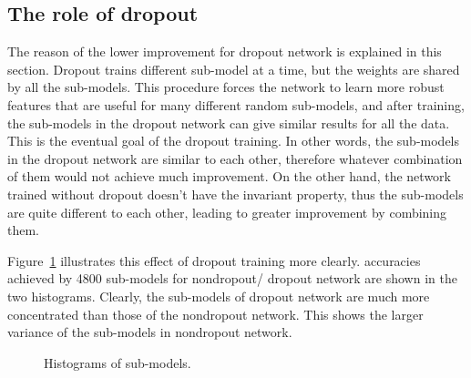 \documentclass{article} %
\begin{document}
\subsection{The role of dropout}
The reason of the lower improvement for dropout network is explained in this section. Dropout trains different sub-model at a time, but the weights are shared by all the sub-models. This procedure forces the network to learn more robust features that are useful for many different random sub-models, and after training, the sub-models in the dropout network can give similar results for all the data. This is the eventual goal of the dropout training. In other words, the sub-models in the dropout network are similar to each other, therefore whatever combination of them would not achieve much improvement. On the other hand, the network trained without dropout doesn't have the invariant property, thus the sub-models are quite different to each other, leading to greater improvement by combining them.
\par
Figure~\ref{hist} illustrates this effect of dropout training more clearly. accuracies achieved by 4800 sub-models for nondropout/ dropout network are shown in the two histograms. Clearly, the sub-models of dropout network are much more concentrated than those of the nondropout network. This shows the larger variance of the sub-models in nondropout network.
\begin{figure}
\centering 
{} 
\caption{ Histograms of sub-models.}
\label{hist} 
\end{figure}
\end{document}
